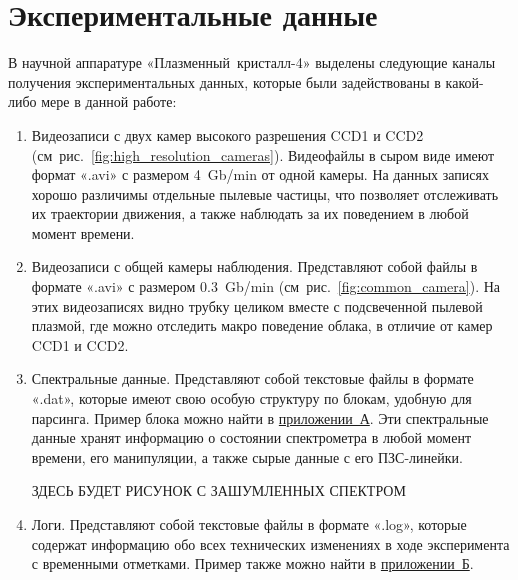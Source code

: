 \section{Экспериментальные данные}
\label{cha:ch_3_4}
В научной аппаратуре «Плазменный~кристалл-4» выделены следующие каналы получения экспериментальных данных,
которые были задействованы в какой-либо мере в данной работе:
\begin{enumerate}
    \item Видеозаписи с двух камер высокого разрешения CCD1 и CCD2 (см~рис.~\ref{fig:high_resolution_cameras}).
    Видеофайлы в сыром виде имеют формат «.avi» с размером 4~Gb/min от одной камеры. На данных записях хорошо
    различимы отдельные пылевые частицы, что позволяет отслеживать их траектории движения, а также наблюдать за
    их поведением в любой момент времени.

    \item Видеозаписи с общей камеры наблюдения. Представляют собой файлы в формате «.avi» с размером 0.3~Gb/min (см~рис.~\ref{fig:common_camera}).
    На этих видеозаписях видно трубку целиком вместе с подсвеченной пылевой плазмой, где можно отследить макро поведение
    облака, в отличие от камер CCD1 и CCD2.

    \item Спектральные данные. Представляют собой текстовые файлы в формате «.dat», которые имеют свою особую структуру
    по блокам, удобную для парсинга. Пример блока можно найти в \hyperref[app:app1]{приложении~А}. Эти спектральные данные
    хранят информацию о состоянии спектрометра в любой момент времени, его манипуляции, а также сырые данные с его ПЗС-линейки.

    ЗДЕСЬ БУДЕТ РИСУНОК С ЗАШУМЛЕННЫХ СПЕКТРОМ

    \item Логи. Представляют собой текстовые файлы в формате «.log», которые содержат информацию обо всех
    технических изменениях в ходе эксперимента с временными отметками. Пример также можно найти в \hyperref[app:app2]{приложении~Б}.
\end{enumerate}
